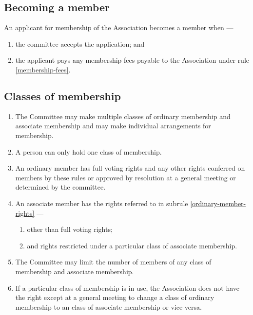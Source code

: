 \documentclass[../constitution.tex]{subfiles}
\begin{document}
\subsection{Becoming a member} \label{becoming-a-member}


An applicant for membership of the Association becomes a member when ---

\begin{enumerate}
  \def\labelenumi{\alph{enumi})}
  \setcounter{enumi}{0}
  \item the committee accepts the application; and
  \item the applicant pays any membership fees payable to the Association under rule \ref{membership-fees}.
\end{enumerate}



\subsection{Classes of membership} \label{classes-of-membership}

\begin{enumerate}
  \item The Committee may make multiple classes of ordinary membership and associate membership and may make individual arrangements for membership.
  \item A person can only hold one class of membership.
  \item An ordinary member has full voting rights and any other rights conferred on members by these rules or approved by resolution at a general meeting or determined by the committee. \label{ordinary-member-rights}
  \item An associate member has the rights referred to in subrule \ref{ordinary-member-rights} --- \label{associate-member-rights}
        \begin{enumerate}
          \item other than full voting rights;
          \item and rights restricted under a particular class of associate membership.
        \end{enumerate}
  \item The Committee may limit the number of members of any class of membership and associate membership.
  \item \label{swap-ordinary-associate-membership} If a particular class of membership is in use, the Association does not have the right except at a general meeting to change a class of ordinary membership to an class of associate membership or vice versa.
\end{enumerate}
\end{document}
